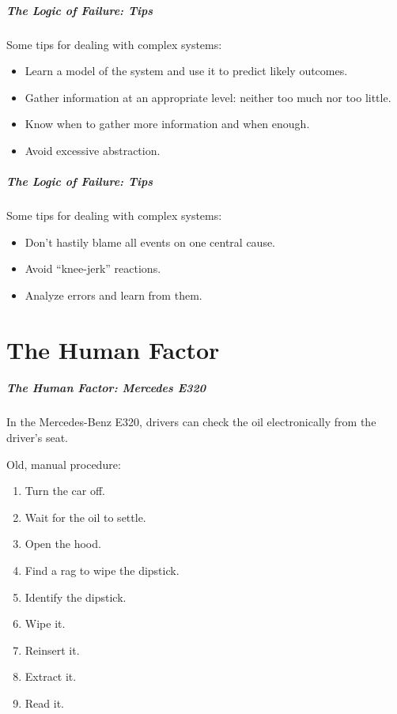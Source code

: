 \begin{frame}
\frametitle{The Logic of Failure: Tips}
\begin{changemargin}{1cm}
 Some tips for dealing with complex systems:
 
\begin{itemize}
	\item Learn a model of the system and use it to predict likely outcomes.
	\item Gather information at an appropriate level: neither too much nor too little.
	\item Know when to gather more information and when enough. 
	\item Avoid excessive abstraction.
\end{itemize}

\end{changemargin}
\end{frame}

\begin{frame}
\frametitle{The Logic of Failure: Tips}
\begin{changemargin}{1cm}
 Some tips for dealing with complex systems:
 
\begin{itemize}
	\item Don't hastily blame all events on one central cause.
	\item Avoid ``knee-jerk'' reactions.
	\item Analyze errors and learn from them.
\end{itemize}

\end{changemargin}
\end{frame}

\part{The Human Factor}
\frame{\partpage}

\begin{frame}
\frametitle{The Human Factor: Mercedes E320}
\begin{changemargin}{1cm}
In the Mercedes-Benz E320, drivers can check the oil electronically from the driver's seat. 

Old, manual procedure:
\begin{enumerate}
	\item Turn the car off.
	\item Wait for the oil to settle.
	\item Open the hood.
	\item Find a rag to wipe the dipstick.
	\item Identify the dipstick.
	\item Wipe it.
	\item Reinsert it.
	\item Extract it.
	\item Read it.
\end{enumerate}
\end{changemargin}
\end{frame}

